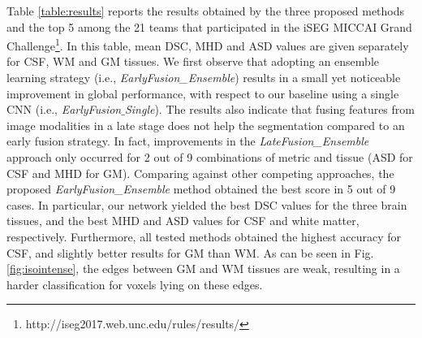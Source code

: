 \documentclass[twoside,espcrc2]{elsarticle}
\begin{document}
Table \ref{table:results} reports the results obtained by the three proposed methods and the top 5 among the 21 teams that participated in the iSEG MICCAI Grand Challenge\footnote{http://iseg2017.web.unc.edu/rules/results/}. In this table, mean DSC, MHD and ASD values are given separately for CSF, WM and GM tissues. We first observe that adopting an ensemble learning strategy (i.e., \textit{EarlyFusion\_Ensemble}) results in a small yet noticeable improvement in global performance, with respect to our baseline using a single CNN (i.e., \textit{EarlyFusion$\_$Single}). The results also indicate that fusing features from image modalities in a late stage does not help the segmentation compared to an early fusion strategy. In fact, improvements in the \textit{LateFusion\_Ensemble} approach only occurred for 2 out of 9 combinations of metric and tissue (ASD for CSF and MHD for GM). %
Comparing against other competing approaches, the proposed \textit{EarlyFusion\_Ensemble} method obtained the best score in 5 out of 9 cases. In particular, our network yielded the best DSC values for the three brain tissues, and the best MHD and ASD values for CSF and white matter, respectively. Furthermore, all tested methods obtained the highest accuracy for CSF, and slightly better results for GM than WM. As can be seen in Fig. \ref{fig:isointense}, the edges between GM and WM tissues are weak, resulting in a harder classification for voxels lying on these edges. 
\end{document}
